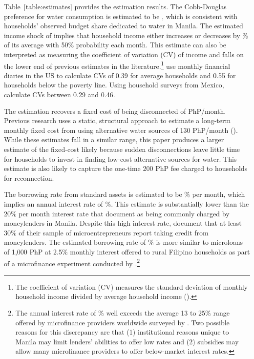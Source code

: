 \documentclass[12pt]{article}
\begin{document}


Table~\ref{table:estimates} provides the estimation results.  The Cobb-Douglas preference for water consumption is estimated to be \unskip, which is consistent with households' observed budget share dedicated to water in Manila.  The estimated income shock of implies that household income either increases or decreases by \unskip\% of its average with 50\% probability each month.  This estimate can also be interpreted as measuring the coefficient of variation (CV) of income and falls on the lower end of previous estimates in the literature.\footnote{The coefficient of variation (CV) measures the standard deviation of monthly household income divided by average household income (\cite{hannagan2015income}).}  \cite{hannagan2015income} use monthly financial diaries in the US to calculate CVs of 0.39 for average households and 0.55 for households below the poverty line.  Using household surveys from Mexico, \cite{amuedo2011remittances} calculate CVs between 0.29 and 0.46. %

The estimation recovers a fixed cost of being disconnected of PhP/month.  Previous research uses a static, structural approach to estimate a long-term monthly fixed cost from using alternative water sources of 130 PhP/month (\cite{wjv}).  While these estimates fall in a similar range, this paper produces a larger estimate of the fixed-cost likely because sudden disconnections leave little time for households to invest in finding low-cost alternative sources for water.  This estimate is also likely to capture the one-time 200 PhP fee charged to households for reconnection.

The borrowing rate from standard assets is estimated to be \unskip\% per month, which implies an annual interest rate of \unskip\%.  This estimate is substantially lower than the 20\% per month interest rate that \cite{karlan2009expanding} document as being commonly charged by moneylenders in Manila.  Despite this high interest rate, \cite{karlan2009expanding} document that at least 30\% of their sample of microentrepreneurs report taking credit from moneylenders.  The estimated borrowing rate of \unskip\% is more similar to microloans of 1,000 PhP at 2.5\% monthly interest offered to rural Filipino households as part of a microfinance experiment conducted by \cite{gine2014group}.\footnote{The annual interest rate of \unskip\% well exceeds the average 13 to 25\% range offered by microfinance providers worldwide surveyed by \cite{cull2009microfinance}.  Two possible reasons for this discrepancy are that (1) institutional reasons unique to Manila may limit lenders' abilities to offer low rates and (2) subsidies may allow many microfinance providers to offer below-market interest rates.}
\end{document}
